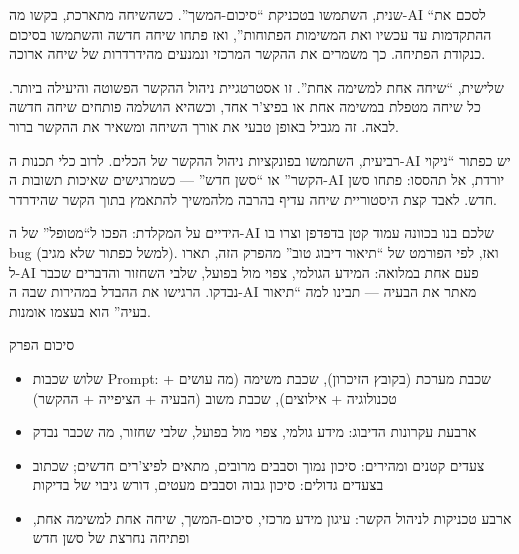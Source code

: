 שנית, השתמשו בטכניקת “סיכום-המשך”. כשהשיחה מתארכת, בקשו מה-AI “לסכם את ההתקדמות עד עכשיו ואת המשימות הפתוחות”, ואז פתחו שיחה חדשה והשתמשו בסיכום כנקודת הפתיחה. כך משמרים את ההקשר המרכזי ונמנעים מהידרדרות של שיחה ארוכה.

שלישית, “שיחה אחת למשימה אחת”. זו אסטרטגיית ניהול ההקשר הפשוטה והיעילה ביותר. כל שיחה מטפלת במשימה אחת או בפיצ'ר אחד, וכשהיא הושלמה פותחים שיחה חדשה לבאה. זה מגביל באופן טבעי את אורך השיחה ומשאיר את ההקשר ברור.

רביעית, השתמשו בפונקציות ניהול ההקשר של הכלים. לרוב כלי תכנות ה-AI יש כפתור “ניקוי הקשר” או “סשן חדש” — כשמרגישים שאיכות תשובות ה-AI יורדת, אל תהססו: פתחו סשן חדש. לאבד קצת היסטוריית שיחה עדיף בהרבה מלהמשיך להתאמץ בתוך הקשר שהידרדר.

\begin{tcbpractice}{הידיים על המקלדת: הפכו ל“מטופל” של ה-AI שלכם}
בנו בכוונה עמוד קטן בדפדפן וצרו בו bug (למשל כפתור שלא מגיב). ואז, לפי הפורמט של “תיאור דיבוג טוב” מהפרק הזה, תארו ל-AI פעם אחת במלואה: המידע הגולמי, צפוי מול בפועל, שלבי השחזור והדברים שכבר נבדקו. הרגישו את ההבדל במהירות שבה ה-AI מאתר את הבעיה — תבינו למה “תיאור בעיה” הוא בעצמו אומנות.

\end{tcbpractice}

\begin{tcbsummary}{סיכום הפרק}
\begin{itemize}
  \item שלוש שכבות Prompt: שכבת מערכת (בקובץ הזיכרון), שכבת משימה (מה עושים + טכנולוגיה + אילוצים), שכבת משוב (הבעיה + הציפייה + ההקשר)
  \item ארבעת עקרונות הדיבוג: מידע גולמי, צפוי מול בפועל, שלבי שחזור, מה שכבר נבדק
  \item צעדים קטנים ומהירים: סיכון נמוך וסבבים מרובים, מתאים לפיצ'רים חדשים; שכתוב בצעדים גדולים: סיכון גבוה וסבבים מעטים, דורש גיבוי של בדיקות
  \item ארבע טכניקות לניהול הקשר: עיגון מידע מרכזי, סיכום-המשך, שיחה אחת למשימה אחת, ופתיחה נחרצת של סשן חדש
\end{itemize}

\end{tcbsummary}
